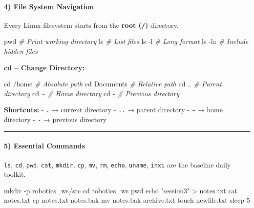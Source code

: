 \documentclass[
  english,
  paper=a4,
  oneside  ,captions=tableheading
]{scrartcl}
\newenvironment{Shaded}{}{}
\newcommand{\AttributeTok}[1]{\textcolor[rgb]{0.49,0.56,0.16}{#1}}
\newcommand{\BuiltInTok}[1]{\textcolor[rgb]{0.00,0.50,0.00}{#1}}
\newcommand{\CommentTok}[1]{\textcolor[rgb]{0.38,0.63,0.69}{\textit{#1}}}
\newcommand{\FunctionTok}[1]{\textcolor[rgb]{0.02,0.16,0.49}{#1}}
\newcommand{\NormalTok}[1]{#1}
\newcommand{\OperatorTok}[1]{\textcolor[rgb]{0.40,0.40,0.40}{#1}}
\newcommand{\StringTok}[1]{\textcolor[rgb]{0.25,0.44,0.63}{#1}}
\begin{document}
\paragraph{4) File System Navigation}\label{file-system-navigation}

Every Linux filesystem starts from the \textbf{root (\texttt{/})}
directory.

\begin{Shaded}
\begin{Highlighting}[]
\BuiltInTok{pwd}             \CommentTok{\# Print working directory}
\FunctionTok{ls}              \CommentTok{\# List files}
\FunctionTok{ls} \AttributeTok{{-}l}           \CommentTok{\# Long format}
\FunctionTok{ls} \AttributeTok{{-}la}          \CommentTok{\# Include hidden files}
\end{Highlighting}
\end{Shaded}

\textbf{cd -- Change Directory:}

\begin{Shaded}
\begin{Highlighting}[]
\BuiltInTok{cd}\NormalTok{ /home        }\CommentTok{\# Absolute path}
\BuiltInTok{cd}\NormalTok{ Documents    }\CommentTok{\# Relative path}
\BuiltInTok{cd}\NormalTok{ ..           }\CommentTok{\# Parent directory}
\BuiltInTok{cd}\NormalTok{ \textasciitilde{}            }\CommentTok{\# Home directory}
\BuiltInTok{cd} \AttributeTok{{-}}            \CommentTok{\# Previous directory}
\end{Highlighting}
\end{Shaded}

\textbf{Shortcuts:} - \texttt{.} → current directory - \texttt{..} →
parent directory - \texttt{\textasciitilde{}} → home directory -
\texttt{-} → previous directory

\begin{center}\rule{0.5\linewidth}{0.5pt}\end{center}

\paragraph{5) Essential Commands}\label{essential-commands}

\texttt{ls}, \texttt{cd}, \texttt{pwd}, \texttt{cat}, \texttt{mkdir},
\texttt{cp}, \texttt{mv}, \texttt{rm}, \texttt{echo}, \texttt{uname},
\texttt{inxi} are the baseline daily toolkit.

\begin{Shaded}
\begin{Highlighting}[]
\FunctionTok{mkdir} \AttributeTok{{-}p}\NormalTok{ robotics\_ws/src}
\BuiltInTok{cd}\NormalTok{ robotics\_ws}
\BuiltInTok{pwd}
\BuiltInTok{echo} \StringTok{"session3"} \OperatorTok{\textgreater{}}\NormalTok{ notes.txt}
\FunctionTok{cat}\NormalTok{ notes.txt}
\FunctionTok{cp}\NormalTok{ notes.txt notes.bak}
\FunctionTok{mv}\NormalTok{ notes.bak archive.txt}
\FunctionTok{touch}\NormalTok{ newfile.txt}
\FunctionTok{sleep}\NormalTok{ 5}
\end{Highlighting}
\end{Shaded}
\end{document}

